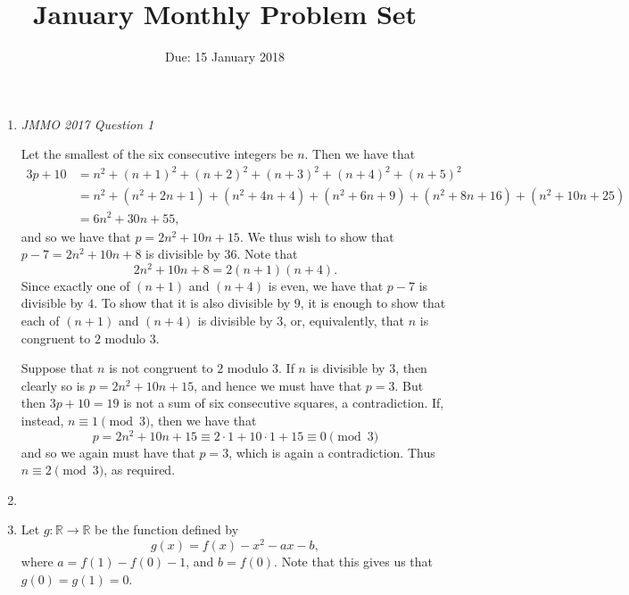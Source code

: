 \documentclass[12pt]{article}
\title{January Monthly Problem Set}
\author{Due: 15 January 2018}
\date{}
\begin{document}
 \maketitle

\begin{enumerate}

\item \textit{JMMO 2017 Question 1}

Let the smallest of the six consecutive integers be $n$. Then we have that
\begin{align*}
    3p + 10 & = n^2 + (n + 1)^2 + (n + 2)^2 + (n + 3)^2 + (n + 4)^2 + (n + 5)^2
    \\
    & = n^2 + (n^2 + 2n + 1) + (n^2 + 4n + 4) + (n^2 + 6n + 9) + (n^2 + 8n + 16)
    + (n^2 + 10n + 25) \\
    & = 6n^2 + 30n + 55,
\end{align*}
and so we have that $p = 2n^2 + 10n + 15$. We thus wish to show that $p - 7 =
2n^2 + 10n + 8$ is divisible by $36$. Note that
\[
    2n^2 + 10n + 8 = 2(n + 1)(n + 4).
\]
Since exactly one of $(n + 1)$ and $(n + 4)$ is even, we have that $p - 7$ is
divisible by $4$. To show that it is also divisible by $9$, it is enough to show
that each of $(n + 1)$ and $(n + 4)$ is divisible by $3$, or, equivalently, that
$n$ is congruent to $2$ modulo $3$. 
        
Suppose that $n$ is not congruent to $2$ modulo $3$. If $n$ is divisible by $3$,
then clearly so is $p = 2n^2 + 10n + 15$, and hence we must have that $p = 3$.
But then $3p + 10 = 19$ is not a sum of six consecutive squares, a
contradiction. If, instead, $n \equiv 1 \pmod 3$, then we have that
\[
    p = 2n^2 + 10n + 15 \equiv 2 \cdot 1 + 10 \cdot 1 + 15 \equiv 0 \pmod 3
\]
and so we again must have that $p = 3$, which is again a contradiction. Thus $n
\equiv 2 \pmod 3$, as required.
        

 
\item %


\item %
Let $g : \mathbb{R} \longrightarrow \mathbb{R}$ be the function defined by
\[
    g(x) = f(x) - x^2 - a x - b,
\]
where $a = f(1) - f(0) - 1$, and $b = f(0)$. Note that this gives us that $g(0)
= g(1) = 0$.


\end{enumerate}
\end{document}

